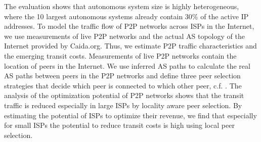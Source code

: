 The evaluation shows that autonomous system size is highly heterogeneous, where the 10 largest autonomous systems already contain 30\% of the active IP addresses.
To model the traffic flow of P2P networks across ISPs in the Internet, we use measurements of live P2P networks and the actual AS topology of the Internet provided by Caida.org.
Thus, we estimate P2P traffic characteristics and the emerging transit costs.
Measurements of live P2P networks contain the location of peers in the Internet.
We use inferred AS paths to calculate the real AS paths between peers in the P2P networks and define three peer selection strategies that decide which peer is connected to which other peer, c.f. \cite{burger2012profit}.
The analysis of the optimization potential of P2P networks shows that the transit traffic is reduced especially in large ISPs by locality aware peer selection.
By estimating the potential of ISPs to optimize their revenue, we find that especially for small ISPs the potential to reduce transit costs is high using local peer selection.

